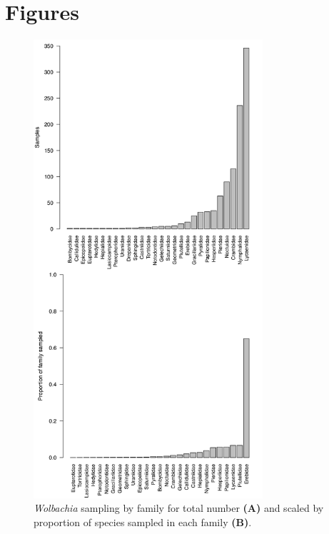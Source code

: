\documentclass{frontiersSCNS}
\begin{document}

\section*{Figures}

\begin{figure}[h!]
\begin{center}
\includegraphics[width=85mm]{Fams_n_Props.pdf}%
\end{center}
\caption{\textit{Wolbachia} sampling by family for total number \textbf{(A)} and scaled by proportion of species sampled in each family \textbf{(B)}.}
\label{histograms}
\end{figure}

\newpage
\end{document}
